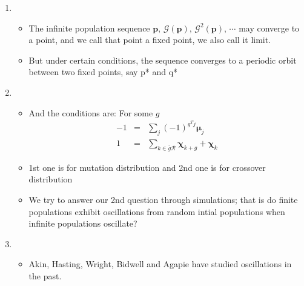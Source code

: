 \documentclass{article}
\begin{document}
\begin{enumerate}
\item
  \begin{itemize}
  \item The infinite population sequence  $\bm{p}, \, \mathcal{G}(\bm{p}), \, {\mathcal{G}}^2(\bm{p}), \, \cdots$ may
    converge to a point, and we call that point a fixed point, we also call it limit.
  \item But under certain conditions, the sequence converges to a
    periodic orbit between two fixed points, say p* and q*
\end{itemize}

\item
  \begin{itemize}
  \item And the conditions are: For some $g$
  \begin{eqnarray*}
      -1 &=& \sum \limits_{j} (-1)^{g^T j} \bm{\mu}_j \\
      1 &=& \sum \limits_{k \in \bar{g}\mathcal{R}} \bm{\chi}_{k+g} + \bm{\chi}_k 
      \end{eqnarray*}
  \item 1st one is for mutation distribution and 2nd one is for crossover distribution
  \item We try to answer our 2nd question through simulations; that is do finite populations exhibit
     oscillations from random intial populations when infinite populations oscillate?
  \end{itemize}
    
\item
  \begin{itemize}
    \item Akin, Hasting, Wright, Bidwell and Agapie have studied oscillations in the past.
  \end{itemize}


\end{enumerate}
\end{document}
